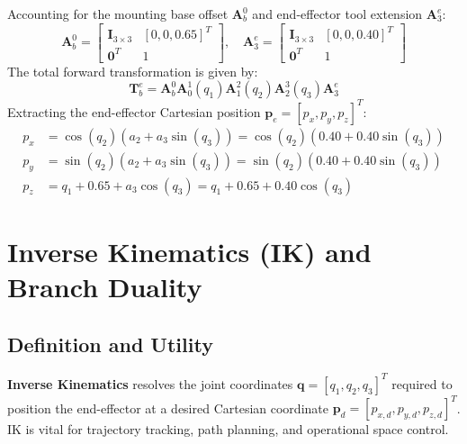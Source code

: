 \documentclass[11pt, a4paper]{article}
\begin{document}
Accounting for the mounting base offset $\mathbf{A}_b^0$ and end-effector tool extension $\mathbf{A}_3^e$:
\begin{equation}
    \mathbf{A}_b^0 = \begin{bmatrix} \mathbf{I}_{3\times 3} & [0, 0, 0.65]^T \\ \mathbf{0}^T & 1 \end{bmatrix}, \quad
    \mathbf{A}_3^e = \begin{bmatrix} \mathbf{I}_{3\times 3} & [0, 0, 0.40]^T \\ \mathbf{0}^T & 1 \end{bmatrix}
\end{equation}
The total forward transformation is given by:
\begin{equation}
    \mathbf{T}_b^e = \mathbf{A}_b^0 \mathbf{A}_0^1(q_1) \mathbf{A}_1^2(q_2) \mathbf{A}_2^3(q_3) \mathbf{A}_3^e
\end{equation}
Extracting the end-effector Cartesian position $\mathbf{p}_e = [p_x, p_y, p_z]^T$:
\begin{equation}
\label{eq:fk_pos}
\begin{aligned}
    p_x &= \cos(q_2)\left(a_2 + a_3\sin(q_3)\right) = \cos(q_2)\left(0.40 + 0.40\sin(q_3)\right) \\
    p_y &= \sin(q_2)\left(a_2 + a_3\sin(q_3)\right) = \sin(q_2)\left(0.40 + 0.40\sin(q_3)\right) \\
    p_z &= q_1 + 0.65 + a_3\cos(q_3) = q_1 + 0.65 + 0.40\cos(q_3)
\end{aligned}
\end{equation}

\section{Inverse Kinematics (IK) and Branch Duality}
\subsection{Definition and Utility}
\textbf{Inverse Kinematics} resolves the joint coordinates $\mathbf{q} = [q_1, q_2, q_3]^T$ required to position the end-effector at a desired Cartesian coordinate $\mathbf{p}_d = [p_{x,d}, p_{y,d}, p_{z,d}]^T$. IK is vital for trajectory tracking, path planning, and operational space control.
\end{document}

